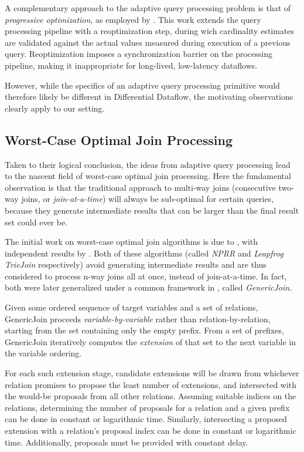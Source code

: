 \documentclass[../index.tex]{subfiles}
\begin{document}
A complementary approach to the adaptive query processing problem is
that of \emph{progressive optimization}, as employed by
\cite{markl2004robust}. This work extends the query processing
pipeline with a reoptimization step, during wich cardinality estimates
are validated against the actual values measured during execution of a
previous query. Reoptimization imposes a synchronization barrier on
the processing pipeline, making it inappropriate for long-lived,
low-latency dataflows.

However, while the specifics of an adaptive query processing primitive
would therefore likely be different in Differential Dataflow, the
motivating observations clearly apply to our setting.

\subsection{Worst-Case Optimal Join Processing} \label{technique-wco}

Taken to their logical conclusion, the ideas from adaptive query
processing lead to the nascent field of worst-case optimal join
processing. Here the fundamental observation is that the traditional
approach to multi-way joins (consecutive two-way joins, or
\emph{join-at-a-time}) will always be sub-optimal for certain queries,
because they generate intermediate results that can be larger than the
final result set could ever be.

The initial work on worst-case optimal join algorithms is due to
\cite{ngo2012worst}, with independent results by
\cite{veldhuizen2012leapfrog}. Both of these algorithms (called
\emph{NPRR} and \emph{Leapfrog TrieJoin} respectively) avoid
generating intermediate results and are thus considered to process
n-way joins all at once, instead of join-at-a-time. In fact, both were
later generalized under a common framework in \cite{ngo2013skew},
called \emph{GenericJoin}.

Given some ordered sequence of target variables and a set of
relations, GenericJoin proceeds \emph{variable-by-variable} rather
than relation-by-relation, starting from the set containing only the
empty prefix. From a set of prefixes, GenericJoin iteratively computes
the \emph{extension} of that set to the next variable in the variable
ordering.

For each such extension stage, candidate extensions will be drawn from
whichever relation promises to propose the least number of extensions,
and intersected with the would-be proposals from all other
relations. Assuming suitable indices on the relations, determining the
number of proposals for a relation and a given prefix can be done in
constant or logarithmic time. Similarly, intersecting a proposed
extension with a relation's proposal index can be done in constant or
logarithmic time. Additionally, proposals must be provided with
constant delay.
\end{document}
